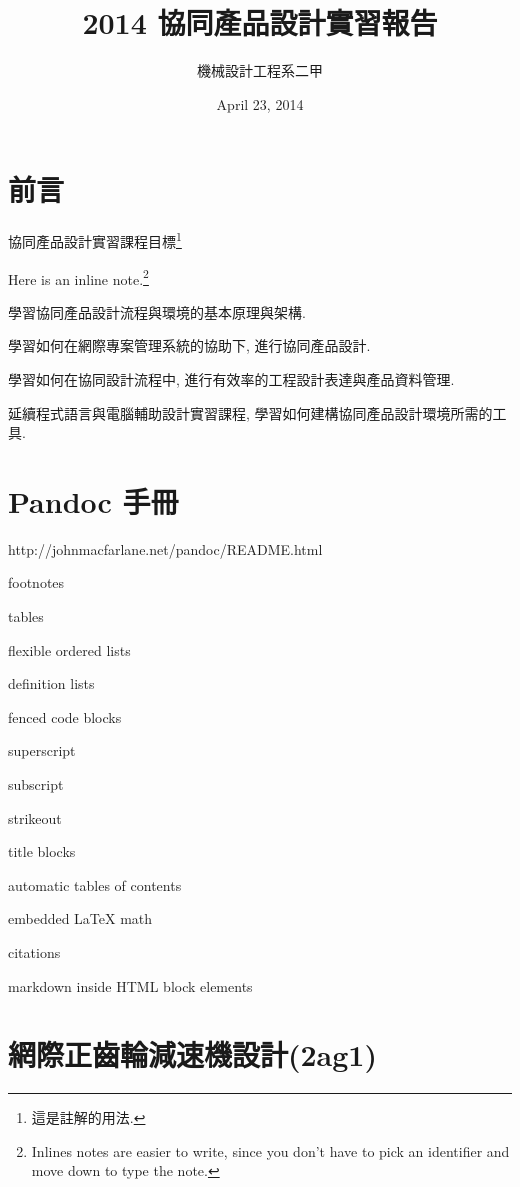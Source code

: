 \documentclass[]{article}
\title{2014 協同產品設計實習報告}
\author{機械設計工程系二甲}
\date{April 23, 2014}
\begin{document}
\maketitle

{
\hypersetup{linkcolor=black}
\setcounter{tocdepth}{3}
\tableofcontents
}
\section{前言}\label{ux524dux8a00}

協同產品設計實習課程目標\footnote{這是註解的用法.}

Here is an inline note.\footnote{Inlines notes are easier to write,
  since you don't have to pick an identifier and move down to type the
  note.}

學習協同產品設計流程與環境的基本原理與架構.

學習如何在網際專案管理系統的協助下, 進行協同產品設計.

學習如何在協同設計流程中, 進行有效率的工程設計表達與產品資料管理.

延續程式語言與電腦輔助設計實習課程,
學習如何建構協同產品設計環境所需的工具.

\section{Pandoc 手冊}\label{pandoc-ux624bux518a}

http://johnmacfarlane.net/pandoc/README.html

footnotes

tables

flexible ordered lists

definition lists

fenced code blocks

superscript

subscript

strikeout

title blocks

automatic tables of contents

embedded LaTeX math

citations

markdown inside HTML block elements

\section{網際正齒輪減速機設計(2ag1)}\label{ux7db2ux969bux6b63ux9f52ux8f2aux6e1bux901fux6a5fux8a2dux8a082ag1}
\end{document}

